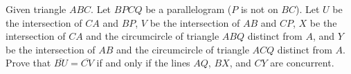 \begin{problem}
    Given triangle $ABC$. Let $BPCQ$ be a parallelogram ($P$ is not on $BC$). Let $U$ be the intersection of $CA$ and $BP$, $V$ be the intersection of $AB$ and $CP$, $X$ be the intersection of $CA$ and the circumcircle of triangle $ABQ$ distinct from $A$, and $Y$ be the intersection of $AB$ and the circumcircle of triangle $ACQ$ distinct from $A$.
Prove that $\overline{BU} = \overline{CV}$ if and only if the lines $AQ$, $BX$, and $CY$ are concurrent.

    \label{24TWNTSTR2.1}

\end{problem}